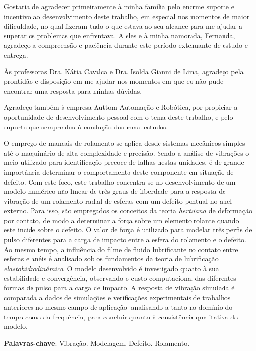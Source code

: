 \imprimircapa
\imprimirfolhaderosto
\clearpage


\begin{agradecimentos}
	Gostaria de agradecer primeiramente à minha família pelo enorme suporte e incentivo ao desenvolvimento deste trabalho, em especial nos momentos de maior dificuldade, no qual fizeram tudo o que estava ao seu alcance para me ajudar a superar os problemas que enfrentava.
	A eles e à minha namorada, Fernanda, agradeço a compreensão e paciência durante este período extenuante de estudo e entrega.
	
	Às professoras Dra. Kátia Cavalca e Dra. Isolda Gianni de Lima, agradeço pela prontidão e disposição em me ajudar nos momentos em que eu não pude encontrar uma resposta para minhas dúvidas.
	
	Agradeço também à empresa Auttom Automação e Robótica, por propiciar a oportunidade de desenvolvimento pessoal com o tema deste trabalho, e pelo suporte que sempre deu à condução dos meus estudos.
\end{agradecimentos}

\begin{resumo}
	O emprego de mancais de rolamento se aplica desde sistemas mecânicos simples até o maquinário de alta complexidade e precisão.
	Sendo a análise de vibrações o meio utilizado para identificação precoce de falhas nestas unidades, é de grande importância determinar o comportamento deste componente em situação de defeito.
	Com este foco, este trabalho concentra-se no desenvolvimento de um modelo numérico não-linear de três graus de liberdade para a resposta de vibração de um rolamento radial de esferas com um defeito pontual no anel externo.
	Para isso, são empregados os conceitos da teoria \emph{hertziana} de deformação por contato, de modo a determinar a força sobre um elemento rolante quando este incide sobre o defeito.
	O valor de força é utilizado para modelar três perfis de pulso diferentes para a carga de impacto entre a esfera do rolamento e o defeito.
	Ao mesmo tempo, a influência do filme de fluido lubrificante no contato entre esferas e anéis é analisado sob os fundamentos da teoria de lubrificação \emph{elastohidrodinâmica}.
	O modelo desenvolvido é investigado quanto à sua estabilidade e convergência, observando o custo computacional das diferentes formas de pulso para a carga de impacto.
	A resposta de vibração simulada é comparada a dados de simulações e verificações experimentais de trabalhos anteriores no mesmo campo de aplicação, analisando-a tanto no domínio do tempo como da frequência, para concluir quanto à consistência qualitativa do modelo.
	\vspace{\onelineskip}
	
	\textbf{Palavras-chave}: Vibração. Modelagem. Defeito. Rolamento.
\end{resumo}


